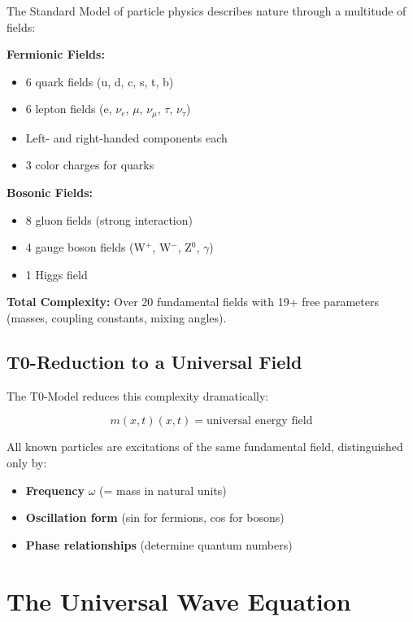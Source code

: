 \documentclass[12pt,a4paper]{report}
\newcommand{\mfield}{m(x,t)}  %
\begin{document}
	The Standard Model of particle physics describes nature through a multitude of fields:
	
	\textbf{Fermionic Fields:}
	\begin{itemize}
		\item 6 quark fields (u, d, c, s, t, b)
		\item 6 lepton fields (e, $\nu_e$, $\mu$, $\nu_\mu$, $\tau$, $\nu_\tau$)
		\item Left- and right-handed components each
		\item 3 color charges for quarks
	\end{itemize}
	
	\textbf{Bosonic Fields:}
	\begin{itemize}
		\item 8 gluon fields (strong interaction)
		\item 4 gauge boson fields (W$^+$, W$^-$, Z$^0$, $\gamma$)
		\item 1 Higgs field
	\end{itemize}
	
	\textbf{Total Complexity:}
	Over 20 fundamental fields with 19+ free parameters (masses, coupling constants, mixing angles).
	
	\subsection{T0-Reduction to a Universal Field}\label{subsec:t0_reduction}
	
	The T0-Model reduces this complexity dramatically:
	
	\begin{equation}\label{eq:universal_energy_field}
		\mfield(x,t) = \text{universal energy field}
	\end{equation}
	
	All known particles are excitations of the same fundamental field, distinguished only by:
	\begin{itemize}
		\item \textbf{Frequency} $\omega$ (= mass in natural units)
		\item \textbf{Oscillation form} (sin for fermions, cos for bosons)
		\item \textbf{Phase relationships} (determine quantum numbers)
	\end{itemize}
	
	\section{The Universal Wave Equation}\label{sec:universal_wave_equation}
	
\end{document}
